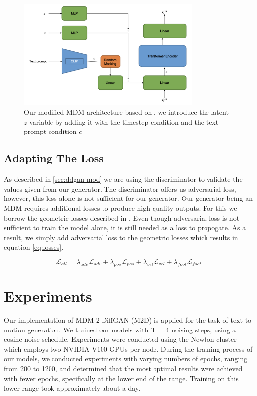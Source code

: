 \documentclass[10pt,twocolumn,letterpaper]{article}
\begin{document}
\begin{figure}[H]
	\centering
	\includegraphics[width=0.8\textwidth]{imgs/modified-MDM.png}
	\caption{Our modified MDM architecture based on \cite{Tevet23}, we introduce the latent $z$ variable by adding it with the timestep condition and the text prompt condition $c$}
	\label{fig:modified-mdm]}
\end{figure}

\subsection{Adapting The Loss}

As described in \ref{sec:ddgan-mod} we are using the discriminator to validate the values given from our generator. The discriminator offers us adversarial loss, however, this loss alone is not sufficient for our generator. Our generator being an MDM requires additional losses to produce high-quality outputs. For this we borrow the geometric losses described in \cite{Tevet23}. Even though adversarial loss is not sufficient to train the model alone, it is still needed as a loss to propogate. As a result, we simply add adversarial loss to the geometric losses which results in equation \ref{eq:losses}.

\begin{equation}\label{eq:losses}
	\mathcal{L}_{all} = \lambda_{adv}\mathcal{L}_{adv} + \lambda_{pos}\mathcal{L}_{pos} + \lambda_{vel}\mathcal{L}_{vel} + \lambda_{foot}\mathcal{L}_{foot} 
\end{equation}

\section{Experiments}
\label{sec:experiments}
Our implementation of MDM-2-DiffGAN (M2D) is applied for the task of text-to-motion generation. We trained our models with T = 4 noising steps, 
using a cosine noise schedule. Experiments were conducted using the Newton cluster which employs two NVIDIA V100 GPUs per node. During the 
training process of our models, we conducted experiments with varying numbers of epochs, ranging from 200 to 1200, and determined that the 
most optimal results were achieved with fewer epochs, specifically at the lower end of the range. Training on this lower range took approximately
about a day.
\\
\end{document}

